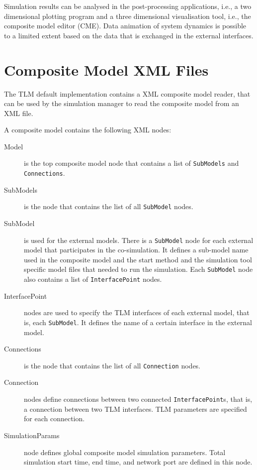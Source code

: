 Simulation results can be analysed in the post-processing applications, i.e., a two dimensional plotting program and a three dimensional visualisation tool, i.e., the composite model editor (CME). 
Data animation of system dynamics is possible to a limited extent based on the data that is exchanged in the external interfaces.

\section{Composite Model XML Files}
\label{meta}
The TLM default implementation contains a XML composite model reader, that can be used by the simulation manager to read the composite model from an XML file.

A composite model contains the following XML nodes:
\begin{description}
\item[Model] is the top composite model node that contains a list of {\tt SubModels} and {\tt Connections}.
\item[SubModels] is the node that contains the list of all {\tt SubModel} nodes.
\item[SubModel] is used for the external models. There is a {\tt SubModel} node for each external model that participates in the co-simulation. 
It defines a sub-model name used in the composite model and the start method and the simulation tool specific model files that needed to run the simulation. 
Each {\tt SubModel} node also contains a list of {\tt InterfacePoint} nodes.
\item[InterfacePoint] nodes are used to specify the TLM interfaces of each external model, that is, each {\tt SubModel}. 
It defines the name of a certain interface in the external model.
\item[Connections] is the node that contains the list of all {\tt Connection} nodes.
\item[Connection] nodes define connections between two connected {\tt InterfacePoint}s, that is, a connection between two TLM interfaces. 
TLM parameters are specified for each connection.
\item[SimulationParams] node defines global composite model simulation parameters. 
Total simulation start time, end time, and network port  are defined in this node.
\end{description}


